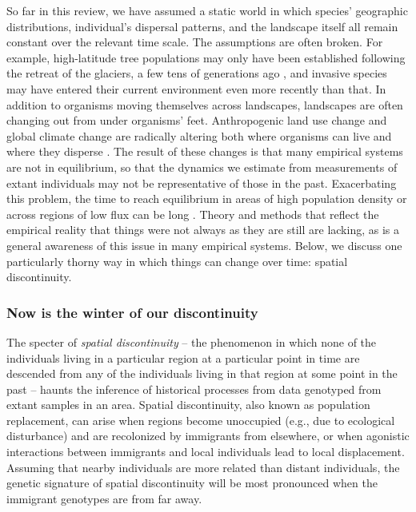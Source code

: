 \documentclass{ar-1col}
\begin{document}
So far in this review, we have assumed a static world
in which species' geographic distributions,
individual's dispersal patterns,
and the landscape itself all remain constant over the relevant time scale.
The assumptions are often broken.
For example, 
high-latitude tree populations may only have been established
following the retreat of the glaciers,
a few tens of generations ago \citep{WhitlockMcCauley1999},
and invasive species may have entered their current
environment even more recently than that.
In addition to organisms moving themselves across landscapes,
landscapes are often changing out from under organisms' feet.
Anthropogenic land use change
and global climate change
are radically altering both where organisms can live
and where they disperse \citep{parmesan1999}.
The result of these changes is that many empirical systems
are not in equilibrium,
so that the dynamics we estimate from
measurements of extant individuals may
not be representative of those in the past.
Exacerbating this problem,
the time to reach equilibrium
in areas of high population density
or across regions of low flux
can be long
\citep{CrowAoki1984group, whitlock1992temporal, slatkin1993isolation, WhitlockMcCauley1999}.
Theory and methods that
reflect the empirical reality that things were not always as they are
still are lacking, 
as is a general awareness of this issue in many empirical systems.
Below, we discuss one particularly thorny way in which 
things can change over time: spatial discontinuity.


\subsubsection{Now is the winter of our discontinuity}

The specter of \textit{spatial discontinuity} --
the phenomenon in which none of the individuals 
living in a particular region at a particular point in time 
are descended from any of the individuals living in that region 
at some point in the past
-- haunts the inference of historical processes
from data genotyped from extant samples in an area.
Spatial discontinuity, 
also known as population replacement, 
can arise when regions become unoccupied
(e.g., due to ecological disturbance) 
and are recolonized by immigrants from elsewhere, 
or when agonistic interactions between immigrants and local individuals 
lead to local displacement. 
Assuming that nearby individuals are more related than distant individuals, 
the genetic signature of spatial discontinuity will be most pronounced 
when the immigrant genotypes are from far away.
\end{document}
